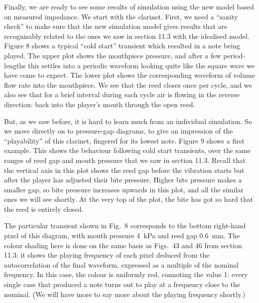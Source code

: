   Finally, we are ready to see some results of simulation using the new model 
  based on measured impedance. We start with the clarinet. First, we need a 
  “sanity check” to make sure that the new simulation model gives results that 
  are recognisably related to the ones we saw in section 11.3 with the 
  idealised model. Figure 8 shows a typical “cold start” transient which 
  resulted in a note being played. The upper plot shows the mouthpiece 
  pressure, and after a few period-lengths this settles into a periodic 
  waveform looking quite like the square wave we have come to expect. The lower 
  plot shows the corresponding waveform of volume flow rate into the 
  mouthpiece. We see that the reed closes once per cycle, and we also see that 
  for a brief interval during each cycle air is flowing in the reverse 
  direction: back into the player’s mouth through the open reed. 

  But, as we saw before, it is hard to learn much from an individual 
  simulation. So we move directly on to pressure-gap diagrams, to give an 
  impression of the “playability” of this clarinet, fingered for its lowest 
  note. Figure 9 shows a first example. This shows the behaviour following cold 
  start transients, over the same ranges of reed gap and mouth pressure that we 
  saw in section 11.3. Recall that the vertical axis in this plot shows the 
  reed gap before the vibration starts but after the player has adjusted their 
  bite pressure. Higher bite pressure makes a smaller gap, so bite pressure 
  increases upwards in this plot, and all the similar ones we will see shortly. 
  At the very top of the plot, the bite has got so hard that the reed is 
  entirely closed. 

  The particular transient shown in Fig.\ 8 corresponds to the bottom 
  right-hand pixel of this diagram, with mouth pressure 4~kPa and reed gap 
  0.6~mm. The colour shading here is done on the same basis as Figs.\ 43 and 46 
  from section 11.3: it shows the playing frequency of each pixel deduced from 
  the autocorrelation of the final waveform, expressed as a multiple of the 
  nominal frequency. In this case, the colour is uniformly red, connoting the 
  value 1: every single case that produced a note turns out to play at a 
  frequency close to the nominal. (We will have more to say more about the 
  playing frequency shortly.) 

